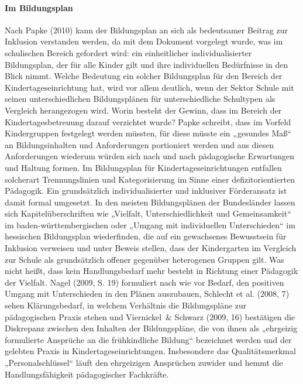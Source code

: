 \paragraph{Im Bildungsplan}
Nach Papke (2010) kann der Bildungsplan an sich als bedeutsamer Beitrag zur Inklusion verstanden werden, da mit dem Dokument vorgelegt wurde, was im schulischen Bereich gefordert wird: ein einheitlicher individualisierter Bildungsplan, der für alle Kinder gilt und ihre individuellen Bedürfnisse in den Blick nimmt. Welche Bedeutung ein solcher Bildungsplan für den Bereich der Kindertageseinrichtung hat, wird vor allem deutlich, wenn der Sektor Schule mit seinen unterschiedlichen Bildungsplänen für unterschiedliche Schultypen als Vergleich herangezogen wird. Worin besteht der Gewinn, dass im Bereich der Kindertagesbetreuung darauf verzichtet wurde? Papke schreibt, dass im Vorfeld Kindergruppen festgelegt werden müssten, für diese müsste ein „gesundes Maß“ an Bildungsinhalten und Anforderungen portioniert werden und aus diesen Anforderungen wiederum würden sich nach und nach pädagogische Erwartungen und Haltung formen. Im Bildungsplan für Kindertageseinrichtungen entfallen solcherart Trennungslinien und Kategorisierung im Sinne einer defizitorientierten Pädagogik. Ein grundsätzlich individualisierter und inklusiver Förderansatz ist damit formal umgesetzt. In den meisten Bildungsplänen der Bundesländer lassen sich Kapitelüberschriften wie „Vielfalt, Unterschiedlichkeit und Gemeinsamkeit“ im baden-württembergischen oder „Umgang mit individuellen Unterschieden“ im hessischen Bildungsplan wiederfinden, die auf ein gewachsenes Bewusstsein für Inklusion verweisen und unter Beweis stellen, dass der Kindergarten im Vergleich zur Schule als grundsätzlich offener gegenüber heterogenen Gruppen gilt. 
Was nicht heißt, dass kein Handlungsbedarf mehr besteht in Richtung einer Pädagogik der Vielfalt. Nagel (2009, S. 19) formuliert nach wie vor Bedarf, den positiven Umgang mit Unterschieden in den Plänen auszubauen, Schlecht et al. (2008, 7) sehen Klärungsbedarf, in welchem Verhältnis die Bildungspläne zur pädagogischen Praxis stehen und Viernickel~\& Schwarz (2009, 16) bestätigen die Diskrepanz zwischen den Inhalten der Bildungspläne, die von ihnen als „ehrgeizig formulierte Ansprüche an die frühkindliche Bildung“ bezeichnet werden und der gelebten Praxis in Kindertageseinrichtungen. Insbesondere das Qualitätsmerkmal „Personalschlüssel“ läuft den ehrgeizigen Ansprüchen zuwider und hemmt die Handlungsfähigkeit pädagogischer Fachkräfte.

